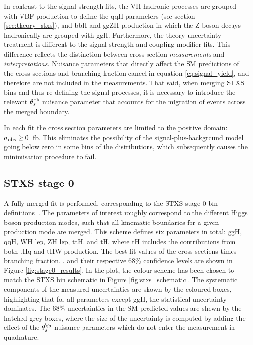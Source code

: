 In contrast to the signal strength fits, the VH hadronic processes are grouped with VBF production to define the qqH parameters (see section \ref{sec:theory_stxs}), and bbH and ggZH production in which the Z boson decays hadronically are grouped with ggH. Furthermore, the theory uncertainty treatment is different to the signal strength and coupling modifier fits. This difference reflects the distinction between cross section \textit{measurements} and \textit{interpretations}. Nuisance parameters that directly affect the SM predictions of the cross sections and branching fraction cancel in equation \ref{eq:signal_yield}, and therefore are not included in the measurements. That said, when merging STXS bins and thus re-defining the signal processes, it is necessary to introduce the relevant $\theta^{\,\rm{th}}_{s}$ nuisance parameter that accounts for the migration of events across the merged boundary. 

In each fit the cross section parameters are limited to the positive domain: $\sigma_{\rm{obs}}\geq0$~fb. This eliminates the possibility of the signal-plus-background model going below zero in some bins of the \mgg distributions, which subsequently causes the minimisation procedure to fail.

\subsection{STXS stage 0}
A fully-merged fit is performed, corresponding to the STXS stage 0 bin definitions~\cite{deFlorian:2016spz}. The parameters of interest roughly correspond to the different Higgs boson production modes, such that all kinematic boundaries for a given production mode are merged. This scheme defines six parameters in total: ggH, qqH, WH lep, ZH lep, ttH, and tH, where tH includes the contributions from both tHq and tHW production. The best-fit values of the cross sections times branching fraction, \xsbr, and their respective 68\% confidence levels are shown in Figure \ref{fig:stage0_results}. In the plot, the colour scheme has been chosen to match the STXS bin schematic in Figure \ref{fig:stxs_schematic}. The systematic components of the measured uncertainties are shown by the coloured boxes, highlighting that for all parameters except ggH, the statistical uncertainty dominates. The 68\% uncertainties in the SM predicted values are shown by the hatched grey boxes, where the size of the uncertainty is computed by adding the effect of the $\vec{\theta}^{\,\rm{th}}_{s}$ nuisance parameters which do not enter the measurement in quadrature.

